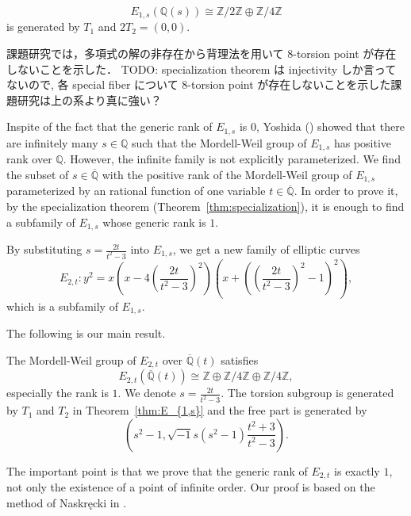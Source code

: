 \documentclass[main]{subfiles}
\begin{document}
\begin{cor}
    \begin{equation*}
        E_{1,s}(\mathbb{Q}(s)) \cong \mathbb{Z} / 2 \mathbb{Z} \oplus \mathbb{Z} / 4 \mathbb{Z}
    \end{equation*}
    is generated by $T_1$ and $2T_2=(0,0)$.
\end{cor}

\begin{rem}
    課題研究では，多項式の解の非存在から背理法を用いて 8-torsion point が存在しないことを示した．
    TODO: specialization theorem は injectivity しか言ってないので, 各 special fiber について 8-torsion point が存在しないことを示した課題研究は上の系より真に強い？
\end{rem}

Inspite of the fact that the generic rank of $E_{1,s}$ is $0$, Yoshida (\cite[Corollary 4.7.]{ref:yoshida}) showed that there are infinitely many $s \in \mathbb{Q}$ such that the Mordell-Weil group of $E_{1,s}$ has positive rank over $\mathbb{Q}$.
However, the infinite family is not explicitly parameterized.
We find the subset of $s \in \overline{{\mathbb{Q}}}$ with the positive rank of the Mordell-Weil group of $E_{1,s}$ parameterized by an rational function of one variable $t \in \overline{\mathbb{Q}}$.
In order to prove it, by the specialization theorem (Theorem~\ref{thm:specialization}), it is enough to find a subfamily of $E_{1,s}$ whose generic rank is $1$.

By substituting $s = \frac{2t}{t^{2} - 3}$ into $E_{1,s}$, we get a new family of elliptic curves
\begin{equation*}
    E_{2,t}: y^{2} = x\left(x - 4\left(\frac{2t}{t^{2} - 3}\right)^{2}\right)\left(x + \left(\left(\frac{2t}{t^{2} - 3}\right)^{2} - 1\right)^{2}\right),
\end{equation*}
which is a subfamily of $E_{1,s}$.

The following is our main result.
\begin{thm}
    \label{thm:E_{2,t}}
    The Mordell-Weil group of $E_{2,t}$ over $\overline{\mathbb{Q}}(t)$ satisfies
    \begin{equation*}
        E_{2,t}(\overline{\mathbb{Q}}(t)) \cong \mathbb{Z} \oplus \mathbb{Z} / 4 \mathbb{Z} \oplus \mathbb{Z} / 4 \mathbb{Z},
    \end{equation*}
    especially the rank is $1$.
    We denote $s = \frac{2t}{t^{2} - 3}$. The torsion subgroup is generated by $T_1$ and $T_2$ in Theorem~\ref{thm:E_{1,s}} and the free part is generated by
    \begin{equation*}
        \left(s^{2} - 1, \sqrt{-1} s(s^{2} - 1) \frac{t^{2} + 3}{t^{2} - 3} \right).
    \end{equation*}
\end{thm}
The important point is that we prove that the generic rank of $E_{2,t}$ is exactly $1$, not only the existence of a point of infinite order.
Our proof is based on the method of Naskręcki in \cite{ref:naskrecki2013}.
\end{document}
